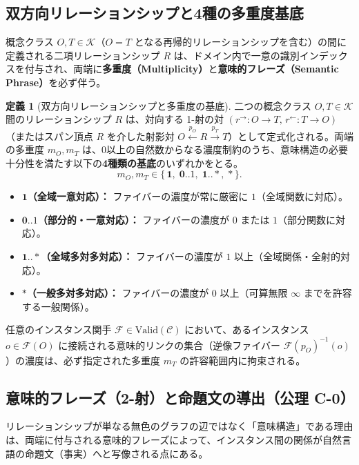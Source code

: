 \documentclass[11pt,a4paper]{ltjsarticle}
\theoremstyle{definition}
\newtheorem{definition}{定義}[section]
\theoremstyle{plain}
\theoremstyle{remark}
\newcommand{\Valid}{\mathrm{Valid}}
\begin{document}
\subsection{双方向リレーションシップと4種の多重度基底}
概念クラス $O, T \in \mathcal{K}$（$O = T$ となる再帰的リレーションシップを含む）の間に定義される二項リレーションシップ $R$ は、ドメイン内で一意の識別インデックスを付与され、両端に\textbf{多重度（Multiplicity）}と\textbf{意味的フレーズ（Semantic Phrase）}を必ず伴う。

\begin{definition}[双方向リレーションシップと多重度の基底]\label{def:relationship}
二つの概念クラス $O, T \in \mathcal{K}$ 間のリレーションシップ $R$ は、対向する 1-射の対 $(r^{\rightarrow} : O \to T,\, r^{\leftarrow} : T \to O)$（またはスパン頂点 $R$ を介した射影対 $O \xleftarrow{p_O} R \xrightarrow{p_T} T$）として定式化される。両端の多重度 $m_O, m_T$ は、0以上の自然数からなる濃度制約のうち、意味構造の必要十分性を満たす以下の\textbf{4種類の基底}のいずれかをとる。
\begin{equation}
m_O, m_T \in \{\, \mathbf{1},\; \mathbf{0..1},\; \mathbf{1..*},\; \mathbf{*} \,\}.
\end{equation}
\begin{itemize}
    \item \textbf{$\mathbf{1}$（全域一意対応）：} ファイバーの濃度が常に厳密に $1$（全域関数に対応）。
    \item \textbf{$\mathbf{0..1}$（部分的・一意対応）：} ファイバーの濃度が $0$ または $1$（部分関数に対応）。
    \item \textbf{$\mathbf{1..*}$（全域多対多対応）：} ファイバーの濃度が $1$ 以上（全域関係・全射的対応）。
    \item \textbf{$\mathbf{*}$（一般多対多対応）：} ファイバーの濃度が $0$ 以上（可算無限 $\infty$ までを許容する一般関係）。
\end{itemize}
\end{definition}

任意のインスタンス関手 $\mathcal{F} \in \Valid(\mathcal{C})$ において、あるインスタンス $o \in \mathcal{F}(O)$ に接続される意味的リンクの集合（逆像ファイバー $\mathcal{F}(p_O)^{-1}(o)$）の濃度は、必ず指定された多重度 $m_T$ の許容範囲内に拘束される。

\subsection{意味的フレーズ（2-射）と命題文の導出（公理 C-0）}
リレーションシップが単なる無色のグラフの辺ではなく「意味構造」である理由は、両端に付与される意味的フレーズによって、インスタンス間の関係が自然言語の命題文（事実）へと写像される点にある。
\end{document}
